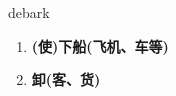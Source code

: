 
\begin{frame}
{\huge debark}
\begin{center}
\begin{enumerate}\Large
  \item \textbf{(使)下船(飞机、车等)}
  \item \textbf{卸(客、货)}
\end{enumerate}
\end{center}
\end{frame}
